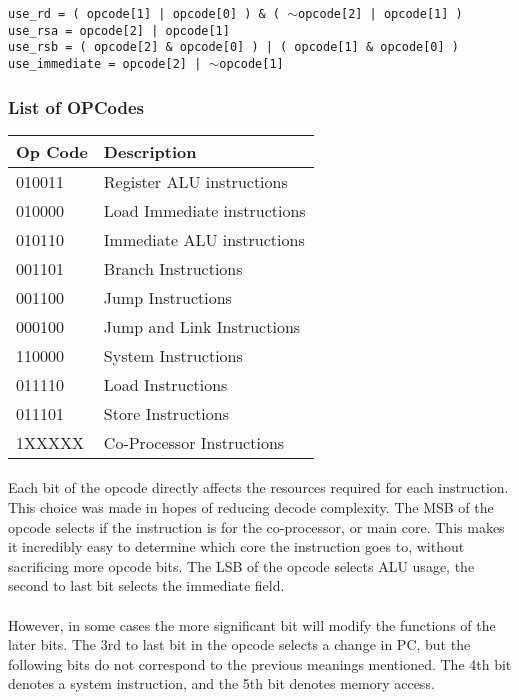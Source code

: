 \documentclass[letterpaper, 11pt]{article}
\begin{document}
{\parindent0pt %
\texttt{use\_rd = ( opcode[1] | opcode[0] ) \& ( $\sim$opcode[2] | opcode[1] ) }\\
\texttt{use\_rsa = opcode[2] | opcode[1] }\\
\texttt{use\_rsb = ( opcode[2] \& opcode[0] ) | ( opcode[1] \& opcode[0] ) }\\
\texttt{use\_immediate = opcode[2] | $\sim$opcode[1] }\\
}%


\subsubsection{List of OPCodes}
	\begin{center}
		\begin{tabular}{|l|l|}
			\hline
			Op Code & Description 				 	\\ \hline
			010011	& Register ALU instructions	 	\\ \hline
			010000	& Load Immediate instructions 	\\ \hline
			010110	& Immediate ALU instructions	\\ \hline
			001101	& Branch Instructions			\\ \hline
			001100	& Jump Instructions				\\ \hline
			000100	& Jump and Link Instructions	\\ \hline
			110000	& System Instructions			\\ \hline
			011110	& Load Instructions				\\ \hline
			011101	& Store Instructions			\\ \hline
			1XXXXX	& Co-Processor Instructions		\\ \hline

		\end{tabular}
	\end{center}
\paragraph{} Each bit of the opcode directly affects the resources required for each instruction. This choice was made 
in hopes of reducing decode complexity. The MSB of the opcode selects if the instruction is for the co-processor,
or main core. This makes it incredibly easy to determine which core the instruction goes to, without sacrificing
more opcode bits. The LSB of the opcode selects ALU usage, the second to last bit selects the immediate field.
\paragraph{} However, in some cases the more significant bit will modify the functions of the later bits. The 3rd to last
bit in the opcode selects a change in PC, but the following bits do not correspond to the previous meanings mentioned. The
4th bit denotes a system instruction, and the 5th bit denotes memory access. 
\newpage
\end{document}
